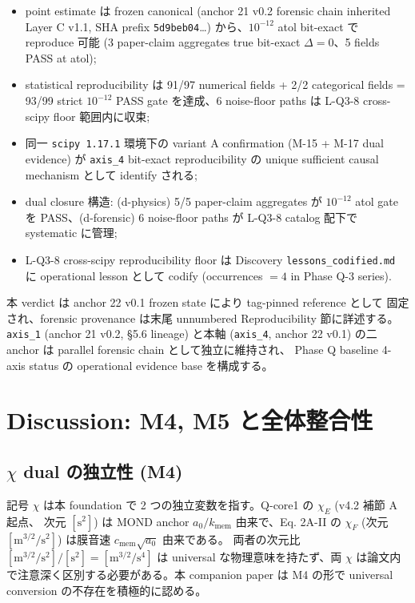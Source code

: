 \documentclass[11pt,a4paper]{ltjsarticle}
\newcommand{\kmem}{k_{\mathrm{mem}}}
\newcommand{\cmem}{c_{\mathrm{mem}}}
\begin{document}
\begin{itemize}
\item[(a)] point estimate は frozen canonical (anchor 21 v0.2 forensic chain
inherited Layer C v1.1, SHA prefix \texttt{5d9beb04}\dots) から、$10^{-12}$
atol bit-exact で reproduce 可能 (3 paper-claim aggregates true bit-exact
$\Delta = 0$、5 fields PASS at atol);
\item[(b)] statistical reproducibility は 91/97 numerical fields + 2/2
categorical fields = 93/99 strict $10^{-12}$ PASS gate を達成、6 noise-floor
paths は L-Q3-8 cross-scipy floor 範囲内に収束;
\item[(c)] 同一 \texttt{scipy 1.17.1} 環境下の variant A confirmation
(M-15 + M-17 dual evidence) が \texttt{axis\_4} bit-exact reproducibility の
unique sufficient causal mechanism として identify される;
\item[(d)] dual closure 構造: (d-physics) 5/5 paper-claim aggregates が
$10^{-12}$ atol gate を PASS、(d-forensic) 6 noise-floor paths が L-Q3-8
catalog 配下で systematic に管理;
\item[(e)] L-Q3-8 cross-scipy reproducibility floor は Discovery
\texttt{lessons\_codified.md} に operational lesson として codify (occurrences
$= 4$ in Phase Q-3 series).
\end{itemize}

\smallskip
\noindent
本 verdict は anchor 22 v0.1 frozen state により tag-pinned reference として
固定され、forensic provenance は末尾 unnumbered Reproducibility 節に詳述する。
\texttt{axis\_1} (anchor 21 v0.2, \S 5.6 lineage) と本軸 (\texttt{axis\_4},
anchor 22 v0.1) の二 anchor は parallel forensic chain として独立に維持され、
Phase Q baseline 4-axis status の operational evidence base を構成する。




\section{Discussion: M4, M5 と全体整合性}

\subsection{$\chi$ dual の独立性 (M4)}
記号 $\chi$ は本 foundation で 2 つの独立変数を指す。Q-core1 の $\chi_E$ (v4.2 補節 A 起点、
次元 $[\mathrm{s}^2]$) は MOND anchor $a_0 / \kmem$ 由来で、Eq. 2A-II の $\chi_F$
(次元 $[\mathrm{m}^{3/2}/\mathrm{s}^2]$) は膜音速 $\cmem \sqrt{a_0}$ 由来である。
両者の次元比 $[\mathrm{m}^{3/2}/\mathrm{s}^2]/[\mathrm{s}^2] = [\mathrm{m}^{3/2}/\mathrm{s}^4]$ は
universal な物理意味を持たず、両 $\chi$ は論文内で注意深く区別する必要がある。本 companion paper は
M4 の形で universal conversion の不存在を積極的に認める。
\end{document}
